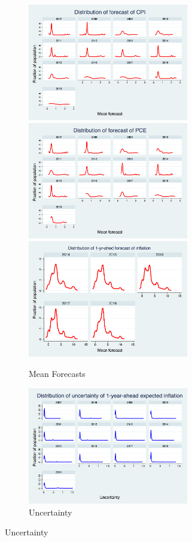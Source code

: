 \documentclass[12pt]{article}
\begin{document}
	
	\begin{figure}[p]
		\begin{subfigure}[b]{0.5\textwidth}
		\centering
		\caption{Mean Forecasts}
		\includegraphics[width=7cm]{figures/PRCCPIMean1_hist.png} 
		\smallskip
		\includegraphics[width=7cm]{figures/PRCPCEMean1_hist.png} 
		\smallskip
		\includegraphics[width=7cm]{figures/SCEmean_hist.png} 
		\end{subfigure}
	   \hfill 
	  	\begin{subfigure}[b]{0.5\textwidth}
	  	\caption{Uncertainty}
		\includegraphics[width=7cm]{figures/PRCCPIVar1_hist.png}  

\end{subfigure}
\end{figure}
\end{document}
